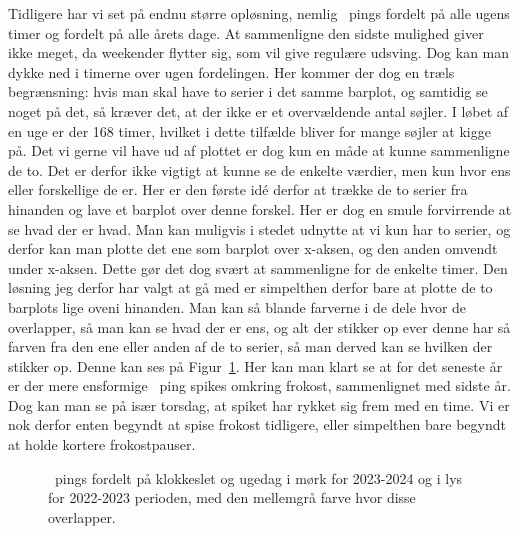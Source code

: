 \begin{article}
Tidligere har vi set på endnu større opløsning, nemlig \coffee\ pings fordelt på alle ugens timer og fordelt på alle årets dage. At sammenligne den sidste mulighed giver ikke meget, da weekender flytter sig, som vil give regulære udsving. Dog kan man dykke ned i timerne over ugen fordelingen.
Her kommer der dog en træls begrænsning: hvis man skal have to serier i det samme barplot, og samtidig se noget på det, så kræver det, at der ikke er et overvældende antal søjler. I løbet af en uge er der 168 timer, hvilket i dette tilfælde bliver for mange søjler at kigge på.
Det vi gerne vil have ud af plottet er dog kun en måde at kunne sammenligne de to. Det er derfor ikke vigtigt at kunne se de enkelte værdier, men kun hvor ens eller forskellige de er. Her er den første idé derfor at trække de to serier fra hinanden og lave et barplot over denne forskel. Her er dog en smule forvirrende at se hvad der er hvad. Man kan muligvis i stedet udnytte at vi kun har to serier, og derfor kan man plotte det ene som barplot over x-aksen, og den anden omvendt under x-aksen. Dette gør det dog svært at sammenligne for de enkelte timer. Den løsning jeg derfor har valgt at gå med er simpelthen derfor bare at plotte de to barplots lige oveni hinanden. Man kan så blande farverne i de dele hvor de overlapper, så man kan se hvad der er ens, og alt der stikker op ever denne har så farven fra den ene eller anden af de to serier, så man derved kan se hvilken der stikker op. Denne kan ses på Figur~\ref{fig:weekday_analysis_hour_imposed_2022-2023_2023-2024}.
Her kan man klart se at for det seneste år er der mere ensformige \coffee\ ping spikes omkring frokost, sammenlignet med sidste år. Dog kan man se på især torsdag, at spiket har rykket sig frem med en time. Vi er nok derfor enten begyndt at spise frokost tidligere, eller simpelthen bare begyndt at holde kortere frokostpauser.

\begin{figure}[H]
	\centering
	\resizebox{\columnwidth}{!}{}
	\vspace{-25pt}
	\caption{\protect\coffee\ pings fordelt på klokkeslet og ugedag i mørk for 2023-2024 og i lys for 2022-2023 perioden, med den mellemgrå farve hvor disse overlapper.}
	\label{fig:weekday_analysis_hour_imposed_2022-2023_2023-2024}
\end{figure}



\end{article}
